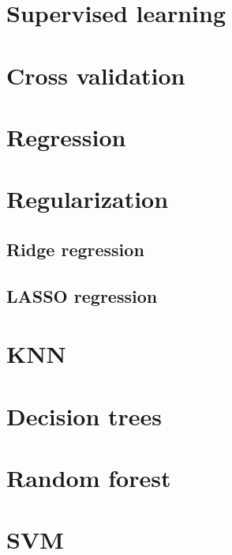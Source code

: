 \documentclass[
]{book}
\begin{document}
\hypertarget{supervised-learning}{%
\section{Supervised learning}\label{supervised-learning}}

\hypertarget{cross-validation}{%
\section{Cross validation}\label{cross-validation}}

\hypertarget{regression}{%
\section{Regression}\label{regression}}

\hypertarget{regularization}{%
\section{Regularization}\label{regularization}}

\hypertarget{ridge-regression}{%
\subsection{Ridge regression}\label{ridge-regression}}

\hypertarget{lasso-regression}{%
\subsection{LASSO regression}\label{lasso-regression}}

\hypertarget{knn}{%
\section{KNN}\label{knn}}

\hypertarget{decision-trees}{%
\section{Decision trees}\label{decision-trees}}

\hypertarget{random-forest}{%
\section{Random forest}\label{random-forest}}

\hypertarget{svm}{%
\section{SVM}\label{svm}}
\end{document}
